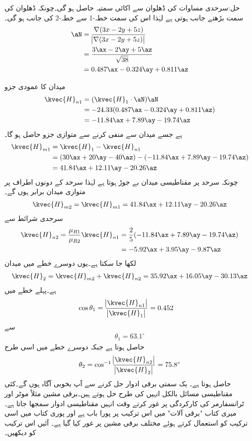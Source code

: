 حل:سرحدی مساوات کی ڈھلوان سے اکائی سمتیہ حاصل ہو گی۔چونکہ ڈھلوان کی سمت بڑھتے جانب ہوتی ہے لہٰذا اس کی سمت خطہ-1 سے خطہ-2 کی جانب ہو گی۔
\begin{align*}
\aN&=\frac{\nabla (3x-2y+5z)}{\abs{\nabla (3x-2y+5z)}}\\
&=\frac{3\ax-2\ay+5\az}{\sqrt{38}}\\
&=0.487\ax-0.324\ay+0.811\az
\end{align*} 

میدان کا عمودی جزو
\begin{align*}
\kvec{H}_{n1}&=(\kvec{H}_1 \cdot \aN) \aN\\
&=-24.33(0.487\ax-0.324\ay+0.811\az)\\
&=-11.84\ax+7.89\ay-19.74\az
\end{align*}
ہے جسے میدان سے منفی کرنے سے متوازی جزو حاصل ہو گا۔
\begin{align*}
\kvec{H}_{m1}&=\kvec{H}_1-\kvec{H}_{n1}\\
&=(30\ax+20\ay-40\az)-(-11.84\ax+7.89\ay-19.74\az)\\
&=41.84\ax+12.11\ay-20.26\az
\end{align*}
چونکہ سرحد پر مقناطیسی میدان بے جوڑ ہوتا ہے لہٰذا سرحد  کے دونوں اطراف پر متوازی میدان برابر ہوں گے۔
\begin{align*}
\kvec{H}_{m2}=\kvec{H}_{m1}=41.84\ax+12.11\ay-20.26\az
\end{align*}
سرحدی شرائط سے 
\begin{align*}
\kvec{H}_{n2}=\frac{\mu_{R1}}{\mu_{R2}} \kvec{H}_{n1}&=\frac{2}{5}(-11.84\ax+7.89\ay-19.74\az)\\
&=-5.92\ax+3.95\ay-9.87\az
\end{align*}
لکھا جا سکتا ہے۔یوں دوسرے خطے میں میدان
\begin{align*}
\kvec{H}_2=\kvec{H}_{m2}+\kvec{H}_{n2}=35.92\ax+16.05\ay-30.13\az
\end{align*}
ہے۔پہلے خطے میں
\begin{align*}
\cos \theta_1&=\frac{\abs{\kvec{H}_{n1}}}{\abs{\kvec{H}_1}}=0.452
\end{align*}
سے
\begin{align*}
\theta_1=63.1^{\circ}
\end{align*}
حاصل ہوتا ہے جبکہ دوسرے خطے میں اسی طرح
\begin{align*}
\theta_2=\cos^{-1} \frac{\abs{\kvec{H}_{n2}}}{\abs{\kvec{H}_2}}=75.8^{\circ}
\end{align*}
حاصل ہوتا ہے۔
یک سمتی برقی ادوار حل کرنے سے آپ بخوبی آگاہ ہوں گے۔کئی مقناطیسی مسائل بالکل انہیں کی طرح حل ہوتے ہیں۔برقی مشین مثلاً موٹر اور ٹرانسفارمر کی کارکردگی پر غور کرتے وقت انہیں مقناطیسی ادوار سمجھا جاتا ہے۔میری کتاب "برقی آلات" میں اس ترکیب پر پورا باب ہے اور پوری کتاب میں اسی ترکیب کو استعمال کرتے ہوئے مختلف برقی مشین پر غور کیا گیا ہے۔ آئیں اس ترکیب کو دیکھیں۔

